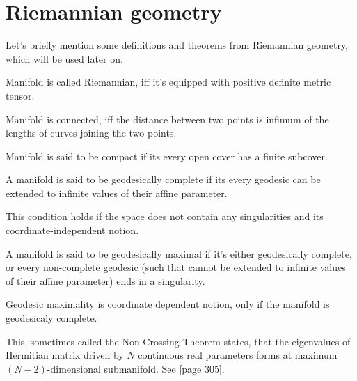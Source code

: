 
\section{Riemannian geometry}
Let's briefly mention some definitions and theorems from Riemannian geometry, which will be used later on.
\begin{definition}
    Manifold is called Riemannian, iff it's equipped with positive definite metric tensor.
\end{definition}
\begin{definition}
    Manifold is connected, iff the distance between two points is infimum of the lengths of curves joining the two points.
\end{definition}
\begin{definition}
    Manifold is said to be compact if its every open cover has a finite subcover.
\end{definition}
\begin{definition}
    A manifold is said to be geodesically complete if its every geodesic can be extended to infinite values of their affine parameter. 
\end{definition}
This condition holds if the space does not contain any singularities and its coordinate-independent notion.
\begin{definition}
    A manifold is said to be geodesically maximal if it's either geodesically complete, or every non-complete geodesic (such that cannot be extended to infinite values of their affine parameter) ends in a singularity.
\end{definition}
Geodesic maximality is coordinate dependent notion, only if the manifold is geodesicaly complete.


\begin{thm}
    \label{thm:n-2}
This, sometimes called the Non-Crossing Theorem states, that the eigenvalues of Hermitian matrix driven by $N$ continuous real parameters forms at maximum $(N-2)$-dimensional submanifold.
 See \cite{landau}[page 305].
\end{thm}


